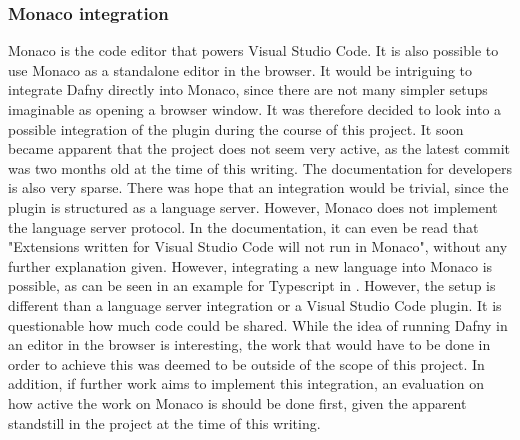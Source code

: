 \subsubsection{Monaco integration}
Monaco\cite{monaco} is the code editor that powers Visual Studio Code. It is also possible to use Monaco as a standalone editor in the browser. It would be intriguing to integrate Dafny directly into Monaco, since there are not many simpler setups imaginable as opening a browser window. It was therefore decided to look into a possible integration of the plugin during the course of this project. \newline
It soon became apparent that the project does not seem very active, as the latest commit was two months old at the time of this writing. The documentation for developers is also very sparse. There was hope that an integration would be trivial, since the plugin is structured as a language server. However, Monaco does not implement the language server protocol. In the documentation, it can even be read that "Extensions written for Visual Studio Code will not run in Monaco"\cite{monaco}, without any further explanation given. \newline
However, integrating a new language into Monaco is possible, as can be seen in an example for Typescript in  \cite{monacoType}. However, the setup is different than a language server integration or a Visual Studio Code plugin. It is questionable how much code could be shared. While the idea of running Dafny in an editor in the browser is interesting, the work that would have to be done in order to achieve this was deemed to be outside of the scope of this project. In addition, if further work aims to implement this integration, an evaluation on how active the work on Monaco is should be done first, given the apparent standstill in the project at the time of this writing.